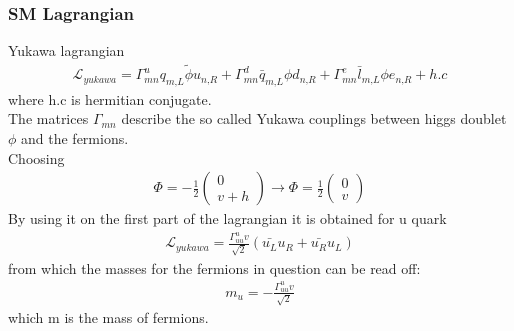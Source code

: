 \documentclass[11pt]{beamer}
\begin{document}
\begin{frame}
\frametitle{SM Lagrangian}
Yukawa lagrangian
\begin{align}
\mathcal{L}_{yukawa}=\Gamma^u_{mn}q_{m\text{,}L} \tilde{\phi} u_{n\text{,}R}+\Gamma^d_{mn}\bar{q}_{m\text{,}L} \phi d_{n\text{,}R}+\Gamma^e_{mn}\bar{l}_{m\text{,}L} \phi e_{n\text{,}R}+h.c
\end{align}
\scriptsize{where h.c is hermitian conjugate. %
\\
The matrices $\Gamma_{mn}$ describe the so called Yukawa couplings between higgs doublet $\phi$ and the fermions.\\
Choosing}
\begin{align*}
\Phi=-\frac{1}{2}\left(\begin{array}{c}
0 \\
v+h
\end{array} \right) \rightarrow  \Phi=\frac{1}{2}\left(\begin{array}{c}
0 \\
v
\end{array} \right) %
\end{align*}
\scriptsize{
By using it on the first part of 
the lagrangian it is obtained for u quark} 
\begin{align*}
\mathcal{L}_{yukawa}=\frac{\Gamma^u_{uu}v}{\sqrt{2}}(\bar{u_L}u_R+\bar{u_R}u_L)
\end{align*}
\scriptsize{
from which the masses for the fermions in question can be read off:}
\begin{align*}
m_u=-\frac{\Gamma^u_{uu}v}{\sqrt{2}}
\end{align*}
which m is the mass of fermions.
\end{frame}
\end{document}
